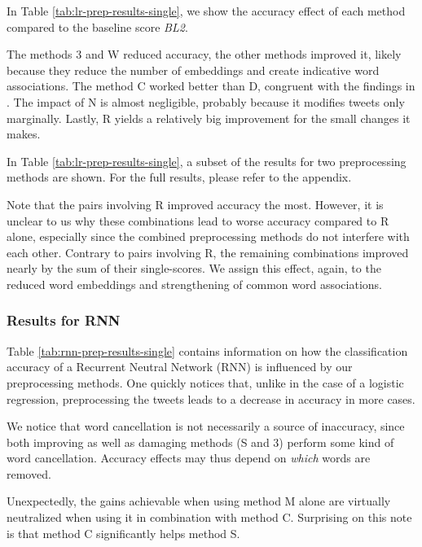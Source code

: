 

In Table \ref{tab:lr-prep-results-single}, we show the accuracy effect of each method compared to the baseline score \textit{BL2}.

The methods 3 and W reduced accuracy, the other methods improved it, likely because they reduce the number of embeddings and create indicative word associations. The method C worked better than D, congruent with the findings in \cite{bao2014role}. The impact of N is almost negligible, probably because it modifies tweets only marginally. Lastly, R yields a relatively big improvement for the small changes it makes.

%

In Table \ref{tab:lr-prep-results-single}, a subset of the results for two preprocessing methods are shown. For the full results, please refer to the appendix.

Note that the pairs involving R improved accuracy the most. However, it is unclear to us why these combinations lead to worse accuracy compared to R alone, especially since the combined preprocessing methods do not interfere with each other. Contrary to pairs involving R, the remaining combinations improved nearly by the sum of their single-scores. We assign this effect, again, to the reduced word embeddings and strengthening of common word associations.

\subsubsection{Results for RNN}

Table \ref{tab:rnn-prep-results-single} contains information on how the classification accuracy of a Recurrent Neutral Network (RNN) is influenced by our preprocessing methods. One quickly notices that, unlike in the case of a logistic regression, preprocessing the tweets leads to a decrease in accuracy in more cases.


%

We notice that word cancellation is not necessarily a source of inaccuracy, since both improving as well as damaging methods (S and 3) perform some kind of word cancellation. Accuracy effects may thus depend on \textit{which} words are removed.

Unexpectedly, the gains achievable when using method M alone are virtually neutralized when using it in combination with method C. Surprising on this note is that method C significantly helps method S.

